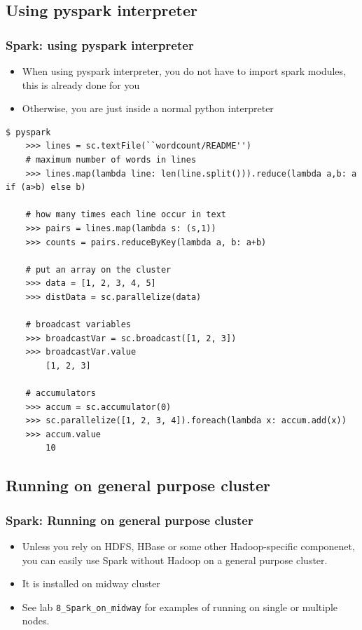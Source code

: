 \documentclass{beamer}
\begin{document}
\subsection{Using pyspark interpreter}
\begin{frame}[fragile]
  \frametitle{Spark: using pyspark interpreter}

\begin{itemize}
  \item When using pyspark interpreter, you do not have to import spark modules, this is already done for you
  \item Otherwise, you are just inside a normal python interpreter
\end{itemize}
{\color{mycolorcli}
  \begin{lstlisting}[frame=single,basicstyle=\tiny]
    $ pyspark
    >>> lines = sc.textFile(``wordcount/README'')
    # maximum number of words in lines
    >>> lines.map(lambda line: len(line.split())).reduce(lambda a,b: a if (a>b) else b)

    # how many times each line occur in text    
    >>> pairs = lines.map(lambda s: (s,1))
    >>> counts = pairs.reduceByKey(lambda a, b: a+b)

    # put an array on the cluster
    >>> data = [1, 2, 3, 4, 5]
    >>> distData = sc.parallelize(data)

    # broadcast variables
    >>> broadcastVar = sc.broadcast([1, 2, 3])
    >>> broadcastVar.value
        [1, 2, 3]

    # accumulators
    >>> accum = sc.accumulator(0)
    >>> sc.parallelize([1, 2, 3, 4]).foreach(lambda x: accum.add(x))
    >>> accum.value
        10
  \end{lstlisting}
}
\end{frame}

\subsection{Running on general purpose cluster}
\begin{frame}[fragile]
\frametitle{Spark: Running on general purpose cluster}

\begin{itemize}
  \item Unless you rely on HDFS, HBase or some other Hadoop-specific componenet, you can easily use Spark without Hadoop on a general purpose cluster.
  \item It is installed on midway cluster
  \item See lab {\color{mycolorcli}\verb|8_Spark_on_midway|} for examples of running on single or multiple nodes.
\end{itemize}

\end{frame}
\end{document}
